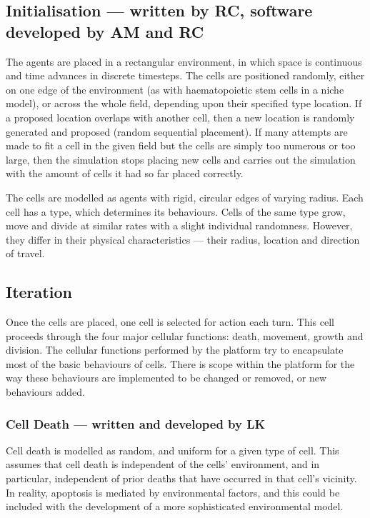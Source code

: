 \documentclass[12pt]{article}
\begin{document}
\subsection{Initialisation --- written by RC, software developed by AM and RC}
The agents are placed in a rectangular environment, in which space is 
continuous and time advances in discrete timesteps. The cells are 
positioned randomly, either on one edge of the environment (as with 
haematopoietic stem cells in a niche model), or across the whole field, 
depending upon their specified type location. If a proposed location 
overlaps with another cell, then a new location is randomly generated 
and proposed (random sequential placement). If many attempts are made to 
fit a cell in the given field but the cells are simply too numerous or
too large, then the simulation stops placing new cells and carries out 
the simulation with the amount of cells it had so far placed correctly.

The cells are modelled as agents with rigid, circular edges of varying 
radius. Each cell has a type, which determines its behaviours. Cells of 
the same type grow, move and divide at similar rates with a slight 
individual randomness. However, they differ in their physical 
characteristics --- their radius, location and direction of travel.

\subsection{Iteration}
Once the cells are placed, one cell is selected for action each turn. 
This cell proceeds through the four major cellular functions: death, 
movement, growth and division. The cellular functions performed by the 
platform try to encapsulate most of the basic behaviours of cells. There 
is scope within the platform for the way these behaviours are 
implemented to be changed or removed, or new behaviours added.

\subsubsection{Cell Death --- written and developed by LK}
Cell death is modelled as random, and uniform for a given type of cell. 
This assumes that cell death is independent of the cells' environment, 
and in particular, independent of prior deaths that have occurred in 
that cell's vicinity. In reality, apoptosis is mediated by environmental 
factors, and this could be included with the development of a more 
sophisticated environmental model.
\end{document}
